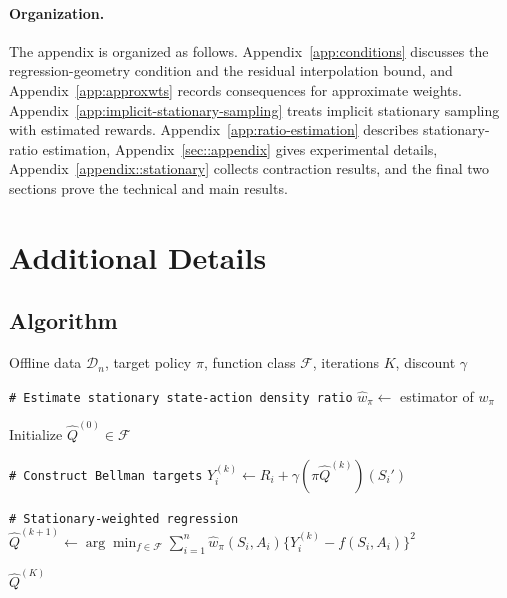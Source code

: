 \documentclass{article}
\newcommand{\ALGCOMMENT}[1]{\item[]\texttt{\#~#1}}
\theoremstyle{plain}
\theoremstyle{definition}
\theoremstyle{remark}
\begin{document}
\paragraph{Organization.} The appendix is organized as follows. Appendix~\ref{app:conditions} discusses
the regression-geometry condition and the residual interpolation bound, and
Appendix~\ref{app:approxwts} records consequences for approximate weights.
Appendix~\ref{app:implicit-stationary-sampling} treats implicit stationary
sampling with estimated rewards. Appendix~\ref{app:ratio-estimation} describes
stationary-ratio estimation, Appendix~\ref{sec::appendix} gives experimental
details, Appendix~\ref{appendix::stationary} collects contraction results, and
the final two sections prove the technical and main results.

\section{Additional Details}




\subsection{Algorithm}

\begin{algorithm}[h]
\caption{\textbf{Stationary-Weighted Fitted \(Q\)-Evaluation}}
\label{alg::sw-fqi}
\begin{algorithmic}[1]

\INPUT Offline data \(\mathcal D_n\), target policy \(\pi\),
function class \(\mathcal F\), iterations \(K\), discount \(\gamma\)

\ALGCOMMENT{Estimate stationary state-action density ratio}
\STATE \(\widehat w_\pi \gets\) estimator of \(w_\pi\)

\STATE Initialize \(\widehat Q^{(0)} \in \mathcal F\)


  \ALGCOMMENT{Construct Bellman targets}
  \STATE \(Y_i^{(k)} \gets R_i + \gamma(\pi \widehat Q^{(k)})(S_i')\)

  \ALGCOMMENT{Stationary-weighted regression}
  \STATE \mbox{\(\widehat Q^{(k+1)} \gets
     \arg\min_{f \in \mathcal F}
     \sum_{i=1}^n \widehat w_\pi(S_i,A_i)
       \bigl\{Y_i^{(k)} - f(S_i,A_i)\bigr\}^2\)}

\ENDFOR

\OUTPUT \(\widehat Q^{(K)}\)

\end{algorithmic}
\end{algorithm}
\end{document}
